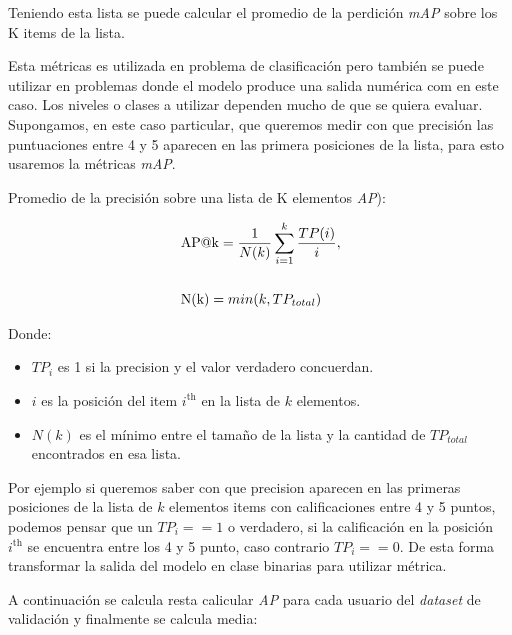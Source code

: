 \documentclass[11pt,a4paper,twoside]{thesis}
\begin{document}
{Teniendo esta lista se puede calcular el promedio de la perdición \textit{mAP\makeatletter@k} sobre los K items de la lista.

Esta métricas es utilizada en problema de clasificación pero también se puede utilizar en problemas donde el modelo produce una salida numérica com en este caso. Los niveles o clases a utilizar dependen mucho de que se quiera evaluar. Supongamos, en este caso particular, que queremos medir con que precisión las puntuaciones entre 4 y 5 aparecen en las primera posiciones de la lista, para esto usaremos la métricas \textit{mAP\makeatletter@k}.

\begin{description}
	\item[Promedio de la precisión sobre una lista de K elementos \textit{AP\makeatletter@k}):]
\end{description}
\begin{equation}
	\begin{split}
	& \operatorname{AP\makeatletter@k}=\frac{1}{N(k)} \sum_{i=1}^k \frac{ TP(i)}{i}, \\
	& \\
	& \operatorname{N(k)} = min(k, TP_{total}) \\
	\end{split}
\end{equation}
\begin{description}
	\item[Donde:]
\end{description}
\begin{itemize}
	\item $TP_i$ es 1 si la precision y el valor verdadero concuerdan.
	\item $i$ es la posición del item $i^\mathrm{th}$ en la lista de $k$ elementos.
	\item $N(k)$ es el mínimo entre el tamaño de la lista y la cantidad de $TP_{total}$ encontrados en esa lista.
\end{itemize}

Por ejemplo si queremos saber con que precision aparecen en las primeras posiciones de la lista de $k$ elementos items con calificaciones entre 4 y 5 puntos, podemos pensar que un $TP_i == 1$ o verdadero, si la calificación en la posición $i^\mathrm{th}$ se encuentra entre los 4 y 5 punto, caso contrario $TP_i == 0$. De esta forma transformar la salida del modelo en clase binarias para utilizar métrica.

A continuación se calcula resta calicular \textit{AP\makeatletter@k} para cada usuario  del \textit{dataset} de validación y finalmente se calcula media: 


}
\end{document}
